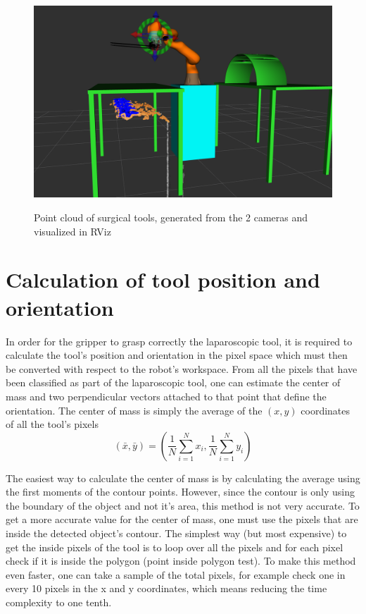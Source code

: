 \begin{center}
\begin{figure}[!htb]
\centering
\includegraphics[width=12cm]{images/point_cloud.png}\\
\caption{Point cloud of surgical tools, generated from the 2 cameras and visualized in RViz}
\end{figure}
\end{center}

\section{Calculation of tool position and orientation}

In order for the gripper to grasp correctly the laparoscopic tool, it is required to calculate the tool's position and orientation in the pixel space 
which must then be converted with respect to the robot's workspace. From all the pixels that have been classified as part of the laparoscopic tool, 
one can estimate the center of mass and two perpendicular vectors 
attached to that point that define the orientation. The center of mass is simply the average of the $(x,y)$ coordinates of all the tool's pixels
\begin{equation}
\left( \bar{x}, \bar{y} \right) = \left( \frac{1}{N}\sum_{i=1}^{N} x_i , \frac{1}{N}\sum_{i=1}^{N} y_i \right)
\end{equation}

The easiest way to calculate the center of mass is by calculating the average using the first moments of the contour points. However, since the contour is only using
the boundary of the object and not it's area, this method is not very accurate. To get a more accurate value for the center of mass, one must use the pixels that are inside 
the detected object's contour. The simplest way (but most expensive) to get the inside pixels of the tool is to loop over all the pixels and for each pixel check if it is inside the 
polygon (point inside polygon test). To make this method even faster, one can take a sample of the total pixels, for example check one in every 10 pixels in the x and y coordinates, 
which means reducing the time complexity to one tenth. \\

